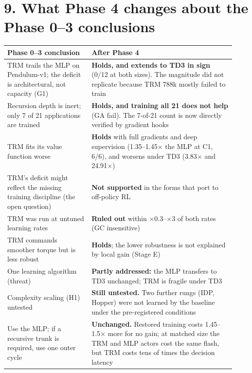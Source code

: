 \documentclass[11pt]{article}
\begin{document}
\section*{9. What Phase 4 changes about the Phase 0--3 conclusions}



\begin{center}\small\begin{tabular}{>{\raggedright\arraybackslash}p{0.346\linewidth}>{\raggedright\arraybackslash}p{0.588\linewidth}}
\toprule
Phase 0--3 conclusion & After Phase 4 \\
\midrule
TRM trails the MLP on Pendulum-v1; the deficit is architectural, not capacity (G1) & \textbf{Holds, and extends to TD3 in sign} (0/12 at both sizes). The magnitude did not replicate because TRM 788k mostly failed to train \\
Recursion depth is inert; only 7 of 21 applications are trained & \textbf{Holds, and training all 21 does not help} (GA fail). The 7-of-21 count is now directly verified by gradient hooks \\
TRM fits its value function worse & \textbf{Holds} with full gradients and deep supervision (1.35--1.45$\times$ the MLP at C1, 6/6), and worsens under TD3 (3.83$\times$ and 24.91$\times$) \\
TRM's deficit might reflect the missing training discipline (the open question) & \textbf{Not supported} in the forms that port to off-policy RL \\
TRM was run at untuned learning rates & \textbf{Ruled out} within $\times$0.3--$\times$3 of both rates (GC insensitive) \\
TRM commands smoother torque but is less robust & \textbf{Holds}; the lower robustness is not explained by local gain (Stage E) \\
One learning algorithm (threat) & \textbf{Partly addressed:} the MLP transfers to TD3 unchanged; TRM is fragile under TD3 \\
Complexity scaling (H1) untested & \textbf{Still untested.} Two further rungs (IDP, Hopper) were not learned by the baseline under the pre-registered conditions \\
Use the MLP; if a recursive trunk is required, use one outer cycle & \textbf{Unchanged.} Restored training costs 1.45--1.5$\times$ more for no gain; at matched size the TRM and MLP actors cost the same flash, but TRM costs tens of times the decision latency \\
\bottomrule
\end{tabular}\end{center}
\end{document}
